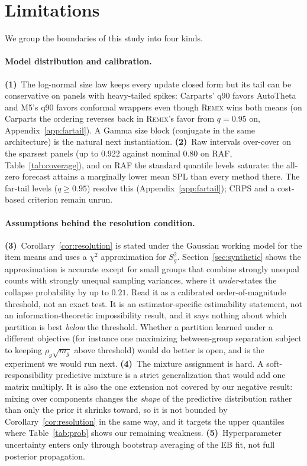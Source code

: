 \documentclass[twocolumn,10pt]{article}
\newcommand{\REMIX}{\textsc{Remix}}
\begin{document}
\section{Limitations}\label{sec:limitations}
We group the boundaries of this study into four kinds.

\paragraph{Model distribution and calibration.}
\textbf{(1)}~The log-normal size law keeps every update closed form but
its tail can be conservative on panels with heavy-tailed spikes:
Carparts' q90 favors AutoTheta and M5's q90 favors conformal wrappers
even though \REMIX{} wins both means (on Carparts the ordering reverses
back in \REMIX{}'s favor from $q{=}0.95$ on,
Appendix~\ref{app:fartail}). A Gamma size block (conjugate in
the same architecture) is the natural next instantiation.
\textbf{(2)}~Raw intervals over-cover on the sparsest panels (up to
$0.922$ against nominal $0.80$ on RAF, Table~\ref{tab:coverage}), and on
RAF the standard quantile levels saturate: the all-zero forecast attains
a marginally lower mean SPL than every method there. The far-tail
levels ($q\ge0.95$) resolve this (Appendix~\ref{app:fartail}); CRPS and
a cost-based criterion remain unrun.

\paragraph{Assumptions behind the resolution condition.}
\textbf{(3)}~Corollary~\ref{cor:resolution} is stated under the Gaussian
working model for the item means and uses a $\chi^2$ approximation for
$S_g^2$. Section~\ref{sec:synthetic} shows the approximation is accurate
except for small groups that combine strongly unequal counts with
strongly unequal sampling variances, where it \emph{under}-states the
collapse probability by up to $0.21$. Read it as a calibrated
order-of-magnitude threshold, not an exact test. It is an
estimator-specific estimability statement, not an information-theoretic
impossibility result, and it says nothing about which partition is best
\emph{below} the threshold. Whether a partition learned under a
different objective (for instance one maximizing between-group
separation subject to keeping $\rho_g\sqrt{m_g}$ above threshold) would
do better is open, and is the experiment we would run next.
\textbf{(4)}~The mixture assignment is hard. A
soft-responsibility predictive mixture is a strict generalization that
would add one matrix multiply. It is also the one extension not covered
by our negative result: mixing over components changes the \emph{shape}
of the predictive distribution rather than only the prior it shrinks
toward, so it is not bounded by Corollary~\ref{cor:resolution} in the
same way, and it targets the upper quantiles where
Table~\ref{tab:prob} shows our remaining weakness. \textbf{(5)}~Hyperparameter uncertainty
enters only through bootstrap averaging of the EB fit, not full posterior
propagation.
\end{document}
